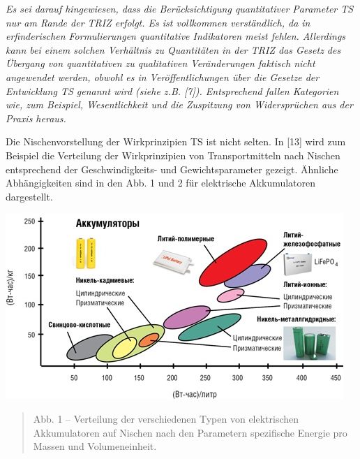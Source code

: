 \documentclass[11pt,a4paper]{article}
\begin{document}
\emph{ Es sei darauf hingewiesen, dass die Berücksichtigung quantitativer
  Parameter TS nur am Rande der TRIZ erfolgt. Es ist vollkommen verständlich,
  da in erfinderischen Formulierungen quantitative Indikatoren meist fehlen.
  Allerdings kann bei einem solchen Verhältnis zu Quantitäten in der TRIZ das
  Gesetz des Übergang von quantitativen zu qualitativen Veränderungen faktisch
  nicht angewendet werden, obwohl es in Veröffentlichungen über die Gesetze
  der Entwicklung TS genannt wird (siehe z.B. [7]). Entsprechend fallen
  Kategorien wie, zum Beispiel, Wesentlichkeit und die Zuspitzung von
  Widersprüchen aus der Praxis heraus.}

Die Nischenvorstellung der Wirkprinzipien TS ist nicht selten.  In [13] wird
zum Beispiel die Verteilung der Wirkprinzipien von Transportmitteln nach
Nischen entsprechend der Ge\-schwin\-dig\-keits- und Gewichtsparameter gezeigt.
Ähnliche Abhängigkeiten sind in den Abb. 1 und 2 für elektrische Akkumulatoren
dargestellt.
\begin{center}
  \includegraphics[width=.7\textwidth]{2164-1.jpg}
  \begin{quote}
    Abb. 1 -- Verteilung der verschiedenen Typen von elektrischen
    Akkumulatoren auf Nischen nach den Parametern spezifische Energie pro
    Massen und Volumeneinheit.
  \end{quote}
\end{center}
\end{document}
